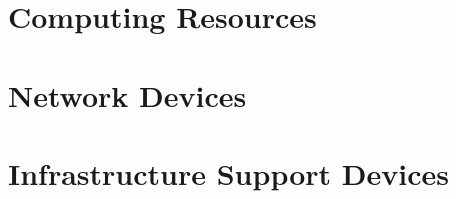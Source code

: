 \section{Computing Resources}


\section{Network Devices}


\section{Infrastructure Support Devices}